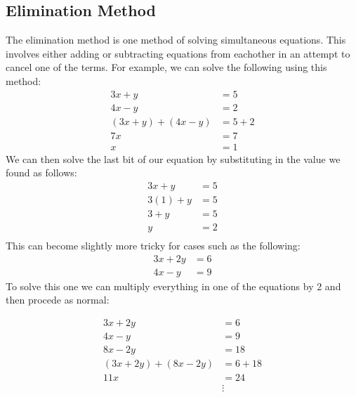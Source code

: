 \documentclass{article}
\begin{document}
\subsection{Elimination Method}
The elimination method is one method of solving simultaneous equations. This involves either adding or subtracting
equations from eachother in an attempt to cancel one of the terms. For example, we can solve the following using this
method:
\begin{align*}
	3x + y &= 5 \\
	4x - y &= 2 \\
	(3x + y) + (4x - y) &= 5 + 2\\
	7x &= 7\\
	x &= 1
\end{align*}
We can then solve the last bit of our equation by substituting in the value we found as follows:
\begin{align*}
	3x + y &= 5 \\
	3(1) + y &= 5 \\
	3 + y &= 5\\
	y &= 2\\
\end{align*}
This can become slightly more tricky for cases such as the following:
\begin{align*}
	3x + 2y &= 6 \\
	4x - y &= 9
\end{align*}
To solve this one we can multiply everything in one of the equations by 2 and then procede as normal:

\begin{align*}
	3x + 2y &= 6 \\
	4x - y &= 9 \\
	8x - 2y &= 18 \\
	(3x + 2y) + (8x -2y) &= 6 + 18 \\
	11x &= 24 \\
	&\vdots
\end{align*}

\break
\end{document}
